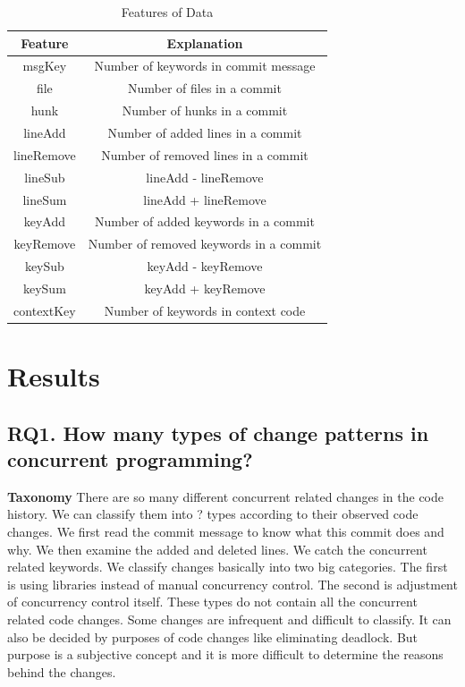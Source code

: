 \documentclass[conference]{IEEEtran}
\begin{document}
\begin{table}
	\centering
	\caption{Features of Data}
	\begin{tabular}{|c|c|}\hline
		Feature&Explanation\\\hline
		msgKey&Number of keywords in commit message\\\hline
		file&Number of files in a commit\\\hline
		hunk&Number of hunks in a commit\\\hline
		lineAdd&Number of added lines in a commit\\\hline
		lineRemove&Number of removed lines in a commit\\\hline
		lineSub&lineAdd - lineRemove\\\hline
		lineSum&lineAdd + lineRemove\\\hline
		keyAdd&Number of added keywords in a commit\\\hline
		keyRemove&Number of removed keywords in a commit\\\hline
		keySub&keyAdd - keyRemove\\\hline
		keySum&keyAdd + keyRemove\\\hline
		contextKey&Number of keywords in context code\\\hline
	\end{tabular}
\end{table}

\section{Results}

\subsection{RQ1. How many types of change patterns in concurrent programming?}

\textbf{Taxonomy} There are so many different concurrent related changes in the code history. We can classify them into ? types according to their observed code changes. We first read the commit message to know what this commit does and why. We then examine the added and deleted lines. We catch the concurrent related keywords. We classify changes basically into two big categories. The first is using libraries instead of manual concurrency control. The second is adjustment of concurrency control itself. These types do not contain all the concurrent related code changes. Some changes are infrequent and difficult to classify. It can also be decided by purposes of code changes like eliminating deadlock. But purpose is a subjective concept and it is more difficult to determine the reasons behind the changes.
\end{document}
